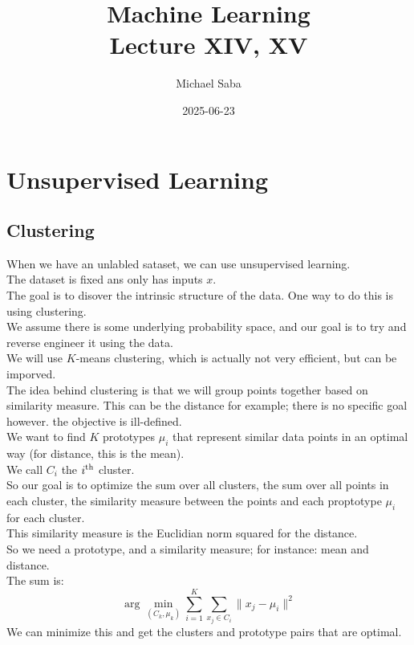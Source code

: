 \documentclass[12pt]{article}
\title{%
    \Huge Machine Learning \\
    \Large Lecture XIV, XV
}
\date{2025-06-23}
\author{Michael Saba}
\begin{document}
\maketitle
\newpage
\setlength{\parindent}{0pt}

\section*{Unsupervised Learning}
\subsection*{Clustering}

When we have an unlabled sataset, we can use
unsupervised learning. \\
The dataset is fixed ans only has inputs $x$. \\

The goal is to disover the intrinsic structure of
the data. One way to do this is using clustering. \\
We assume there is some underlying probability space,
and our goal is to try and reverse engineer it using the
data. \\

We will use $K$-means clustering, which is actually not
very efficient, but can be imporved. \\

The idea behind clustering is that we will group
points together based on similarity measure.
This can be the distance for example; there is no
specific goal however. the objective is ill-defined. \\

We want to find $K$ prototypes $\mu_i$ that represent
similar data points in an optimal way
(for distance, this is the mean). \\
We call $C_i$ the $i^{\text{th}}$ cluster. \\

So our goal is to optimize the sum over all
clusters, the sum over all points in each cluster,
the similarity measure between the points
and each proptotype $\mu_i$ for each cluster. \\
This similarity measure is the Euclidian norm
squared for the distance. \\

So we need a prototype, and a similarity measure;
for instance: mean and distance. \\

The sum is:
\[ \arg \min_{(C_k, \mu_k)} \sum_{i=1}^K \sum_{x_j \in C_i}
\|x_j - \mu_i\|^2 \]
We can minimize this and get the clusters and prototype
pairs that are optimal. \\
\end{document}
